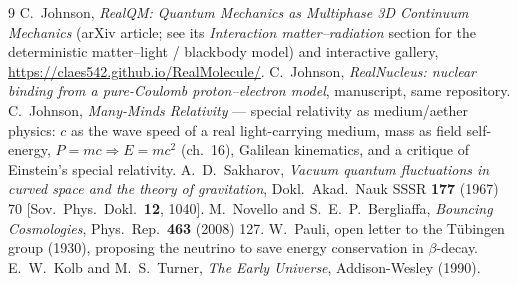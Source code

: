 \documentclass[11pt]{article}
\begin{document}
\begin{thebibliography}{9}
 C.\ Johnson, \emph{RealQM: Quantum Mechanics as Multiphase 3D Continuum Mechanics}
(arXiv article; see its \emph{Interaction matter--radiation} section for the deterministic matter--light /
blackbody model) and interactive gallery, \url{https://claes542.github.io/RealMolecule/}.
 C.\ Johnson, \emph{RealNucleus: nuclear binding from a pure-Coulomb
proton--electron model}, manuscript, same repository.
 C.\ Johnson, \emph{Many-Minds Relativity} --- special relativity as medium/aether
physics: $c$ as the wave speed of a real light-carrying medium, mass as field self-energy, $P=mc
\Rightarrow E=mc^2$ (ch.~16), Galilean kinematics, and a critique of Einstein's special relativity.
 A.\ D.\ Sakharov, \emph{Vacuum quantum fluctuations in curved space and the theory
of gravitation}, Dokl.\ Akad.\ Nauk SSSR \textbf{177} (1967) 70 [Sov.\ Phys.\ Dokl.\ \textbf{12},
1040].
 M.\ Novello and S.\ E.\ P.\ Bergliaffa, \emph{Bouncing Cosmologies}, Phys.\ Rep.\
\textbf{463} (2008) 127.
 W.\ Pauli, open letter to the Tübingen group (1930), proposing the neutrino to save
energy conservation in $\beta$-decay.
 E.\ W.\ Kolb and M.\ S.\ Turner, \emph{The Early Universe}, Addison-Wesley
(1990).
\end{thebibliography}
\end{document}
